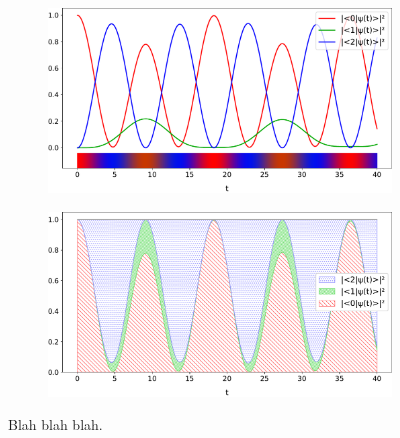 \begin{figure}[h]
  \begin{subfigure}[b]{\textwidth}
    \centering
    \includegraphics[width=.8\textwidth]{img/3ldetect/hermitian3lines.pdf}
  \end{subfigure}
  \par\bigskip
  \par\bigskip
  \begin{subfigure}[b]{\textwidth}
    \centering
    \includegraphics[width=.8\textwidth]{img/3ldetect/hermitian3color.pdf}
  \end{subfigure}
  \par\bigskip
  \par\bigskip
  \caption{
    Blah blah blah.
  }
  \label{fig:3lev_probs}
\end{figure}






